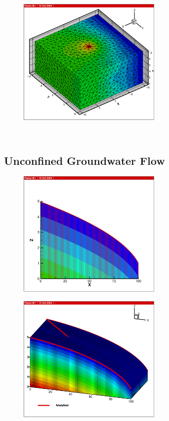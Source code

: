 {\begin{figure}[htb!]
  \includegraphics[width=7cm]{figures/h_tet3.eps}\\
\end{figure}

\newpage $ $ \newpage
\subsection{Unconfined Groundwater Flow}

\begin{figure}[htb!]
  \includegraphics[width=7cm]{figures/h_uc_quad.eps}\\
\end{figure}

\begin{figure}[htb!]
  \includegraphics[width=7cm]{figures/h_uc_pris.eps}\\
\end{figure}

}
